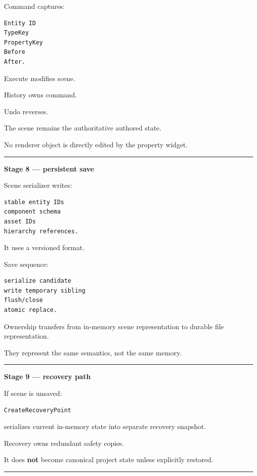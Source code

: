 Command captures:

\begin{verbatim}
Entity ID
TypeKey
PropertyKey
Before
After.
\end{verbatim}

Execute modifies scene.

History owns command.

Undo reverses.

The scene remains the authoritative authored state.

No renderer object is directly edited by the property widget.

\begin{center}\rule{0.5\linewidth}{0.5pt}\end{center}

\textbf{Stage 8 --- persistent save}

Scene serializer writes:

\begin{verbatim}
stable entity IDs
component schema
asset IDs
hierarchy references.
\end{verbatim}

It uses a versioned format.

Save sequence:

\begin{verbatim}
serialize candidate
write temporary sibling
flush/close
atomic replace.
\end{verbatim}

Ownership transfers from in-memory scene representation to durable file representation.

They represent the same semantics, not the same memory.

\begin{center}\rule{0.5\linewidth}{0.5pt}\end{center}

\textbf{Stage 9 --- recovery path}

If scene is unsaved:

\begin{verbatim}
CreateRecoveryPoint
\end{verbatim}

serializes current in-memory state into separate recovery snapshot.

Recovery owns redundant safety copies.

It does \textbf{not} become canonical project state unless explicitly restored.

\begin{center}\rule{0.5\linewidth}{0.5pt}\end{center}

